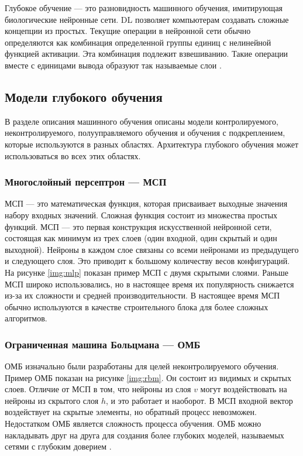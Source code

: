 Глубокое обучение — это разновидность машинного обучения, имитирующая биологические нейронные сети. DL позволяет компьютерам создавать сложные концепции из простых. Текущие операции в нейронной сети обычно определяются как комбинация определенной группы единиц с нелинейной функцией активации. Эта комбинация подлежит взвешиванию. Такие операции вместе с единицами вывода образуют так называемые слои \cite{deeplearninmob}.

\subsection*{Модели глубокого обучения}

В разделе описания машинного обучения описаны модели контролируемого, неконтролируемого, полууправляемого обучения и обучения с подкреплением, которые используются в разных областях. Архитектура глубокого обучения может использоваться во всех этих областях.

\subsubsection*{Многослойный персептрон --- МСП}

МСП --- это математическая функция, которая присваивает выходные значения набору входных значений. Сложная функция состоит из множества простых функций. МСП — это первая конструкция искусственной нейронной сети, состоящая как минимум из трех слоев (один входной, один скрытый и один выходной). Нейроны в каждом слое связаны со всеми нейронами из предыдущего и следующего слоя. Это приводит к большому количеству весов конфигураций. На рисунке \ref{img:mlp} показан пример МСП с двумя скрытыми слоями. Раньше МСП широко использовались, но в настоящее время их популярность снижается из-за их сложности и средней производительности. В настоящее время МСП обычно используются в качестве строительного блока для более сложных алгоритмов.


\FloatBarrier

\subsubsection*{Ограниченная машина Больцмана --- ОМБ}

ОМБ изначально были разработаны для целей неконтролируемого обучения. Пример ОМБ показан на рисунке \ref{img:rbm}. Он состоит из видимых и скрытых слоев. Отличие от МСП в том, что нейроны из слоя $v$ могут воздействовать на нейроны из скрытого слоя $h$, и это работает и наоборот. В МСП входной вектор воздействует на скрытые элементы, но обратный процесс невозможен. Недостатком ОМБ является сложность процесса обучения. ОМБ можно накладывать друг на друга для создания более глубоких моделей, называемых сетями с глубоким доверием \cite{beginguidetorbm}.

